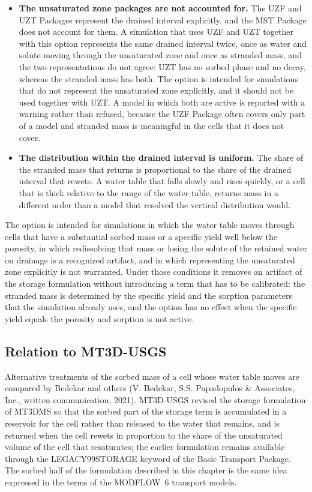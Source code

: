 \begin{itemize}
\item \textbf{The unsaturated zone packages are not accounted for.} The UZF and UZT Packages represent the drained interval explicitly, and the MST Package does not account for them. A simulation that uses UZF and UZT together with this option represents the same drained interval twice, once as water and solute moving through the unsaturated zone and once as stranded mass, and the two representations do not agree: UZT has no sorbed phase and no decay, whereas the stranded mass has both. The option is intended for simulations that do not represent the unsaturated zone explicitly, and it should not be used together with UZT. A model in which both are active is reported with a warning rather than refused, because the UZF Package often covers only part of a model and stranded mass is meaningful in the cells that it does not cover.

\item \textbf{The distribution within the drained interval is uniform.} The share of the stranded mass that returns is proportional to the share of the drained interval that rewets. A water table that falls slowly and rises quickly, or a cell that is thick relative to the range of the water table, returns mass in a different order than a model that resolved the vertical distribution would.

\end{itemize}

The option is intended for simulations in which the water table moves through cells that have a substantial sorbed mass or a specific yield well below the porosity, in which redissolving that mass or losing the solute of the retained water on drainage is a recognized artifact, and in which representing the unsaturated zone explicitly is not warranted. Under those conditions it removes an artifact of the storage formulation without introducing a term that has to be calibrated: the stranded mass is determined by the specific yield and the sorption parameters that the simulation already uses, and the option has no effect when the specific yield equals the porosity and sorption is not active.

\subsection{Relation to MT3D-USGS}

Alternative treatments of the sorbed mass of a cell whose water table moves are compared by Bedekar and others (V. Bedekar, S.S. Papadopulos \& Associates, Inc., written communication, 2021). MT3D-USGS \citep{mt3dusgs} revised the storage formulation of MT3DMS so that the sorbed part of the storage term is accumulated in a reservoir for the cell rather than released to the water that remains, and is returned when the cell rewets in proportion to the share of the unsaturated volume of the cell that resaturates; the earlier formulation remains available through the LEGACY99STORAGE keyword of the Basic Transport Package. The sorbed half of the formulation described in this chapter is the same idea expressed in the terms of the MODFLOW~6 transport models.

